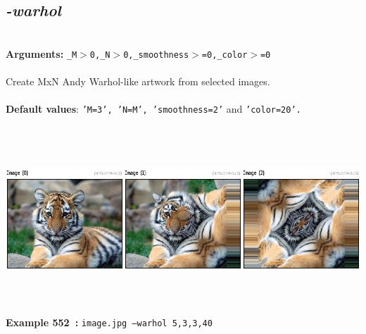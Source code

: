 \documentclass[a4paper,11pt,twoside]{book}
\begin{document}
\subsection{\emph{-warhol} }\vspace*{-0.5em}
~\\\textbf{Arguments: } 
{\small \texttt{\_M$>$0,\_N$>$0,\_smoothness$>$=0,\_color$>$=0}}\\~\\
Create MxN Andy Warhol-like artwork from selected images.
~\\~\\\textbf{Default values}: {\small \texttt{'M=3', 'N=M', 'smoothness=2'} and \texttt{'color=20'.}}
\begin{center}\includegraphics[keepaspectratio=true,height=7cm,width=\textwidth]{img/gmic_def552.jpg}\\
{\footnotesize \textbf{Example 552~:} \texttt{image.jpg --warhol 5,3,3,40}}
\end{center}
\end{document}
